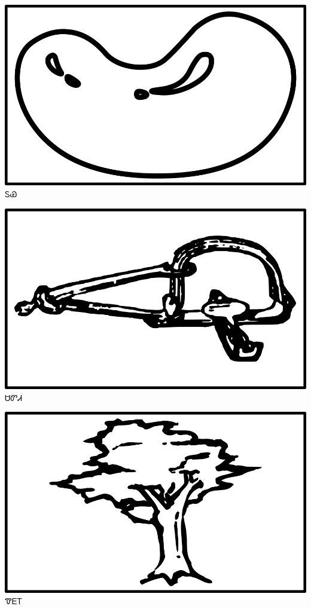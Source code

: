 \documentclass[avery5371]{flashcards}%
\begin{document}
\begin{flashcard}{
\includegraphics[width=0.95\columnwidth,height=.51\columnwidth,keepaspectratio]{../artwork/objects-neutral/tuya}
}
\Huge ᏚᏯ
\end{flashcard}

\begin{flashcard}{
\includegraphics[width=0.95\columnwidth,height=.51\columnwidth,keepaspectratio]{../artwork/objects-neutral/sadvdi}
}
\Huge ᏌᏛᏗ
\end{flashcard}

\begin{flashcard}{
\includegraphics[width=0.95\columnwidth,height=.51\columnwidth,keepaspectratio]{../artwork/objects-rod/hlgv}
}
\Huge ᏡᎬᎢ
\end{flashcard}
\end{document}
